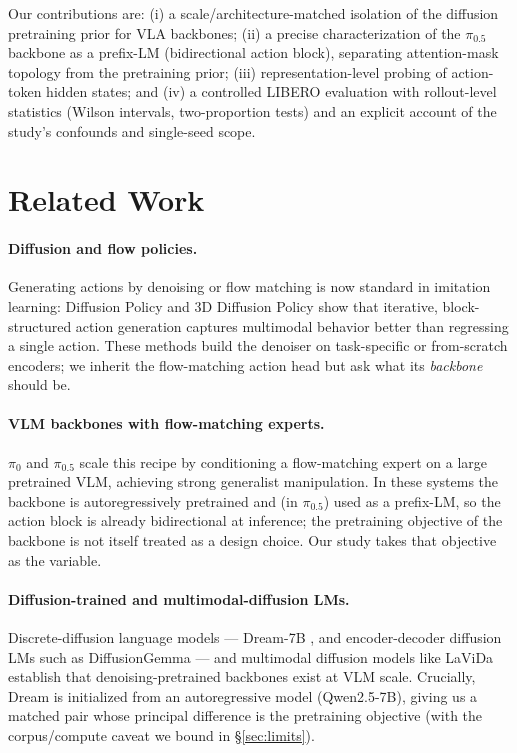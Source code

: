 \documentclass[conference]{IEEEtran}
\begin{document}
Our contributions are: (i) a scale/architecture-matched isolation of the
diffusion pretraining prior for VLA backbones; (ii) a precise characterization of
the \(\pi_{0.5}\) backbone as a prefix-LM (bidirectional action block), separating
attention-mask topology from the pretraining prior; (iii) representation-level
probing of action-token hidden states; and (iv) a controlled LIBERO evaluation
with rollout-level statistics (Wilson intervals, two-proportion tests) and an
explicit account of the study's confounds and single-seed scope.

\section{Related Work}

\paragraph{Diffusion and flow policies.} Generating actions by denoising or flow
matching is now standard in imitation learning: Diffusion Policy \cite{diffusion_policy}
and 3D Diffusion Policy \cite{dp3} show that iterative, block-structured action
generation captures multimodal behavior better than regressing a single action.
These methods build the denoiser on task-specific or from-scratch encoders; we
inherit the flow-matching action head but ask what its \emph{backbone} should be.

\paragraph{VLM backbones with flow-matching experts.} $\pi_0$ and $\pi_{0.5}$
\cite{pi0,pi05,openpi} scale this recipe by conditioning a flow-matching expert on
a large pretrained VLM, achieving strong generalist manipulation. In these systems
the backbone is autoregressively pretrained and (in $\pi_{0.5}$) used as a
prefix-LM, so the action block is already bidirectional at inference; the
pretraining objective of the backbone is not itself treated as a design choice.
Our study takes that objective as the variable.

\paragraph{Diffusion-trained and multimodal-diffusion LMs.} Discrete-diffusion
language models --- Dream-7B \cite{dream}, and encoder-decoder diffusion LMs such
as DiffusionGemma \cite{diffusiongemma_docs} --- and multimodal diffusion models
like LaViDa \cite{lavida} establish that denoising-pretrained backbones exist at
VLM scale. Crucially, Dream is initialized from an autoregressive model
(Qwen2.5-7B), giving us a matched pair whose principal difference is the
pretraining objective (with the corpus/compute caveat we bound in
\S\ref{sec:limits}).
\end{document}
